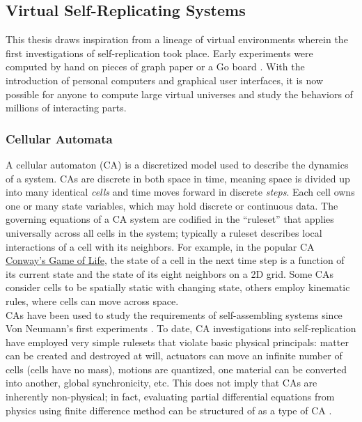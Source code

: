 {\subsection{Virtual Self-Replicating Systems}

This thesis draws inspiration from a lineage of virtual environments wherein the first investigations of self-replication took place.  Early experiments were computed by hand on pieces of graph paper or a Go board \cite{Gardner1970}.  With the introduction of personal computers and graphical user interfaces, it is now possible for anyone to compute large virtual universes and study the behaviors of millions of interacting parts.

\subsubsection{Cellular Automata}

A cellular automaton (CA) is a discretized model used to describe the dynamics of a system.  CAs are discrete in both space in time, meaning space is divided up into many identical \textit{cells} and time moves forward in discrete \textit{steps}.  Each cell owns one or many state variables, which may hold discrete or continuous data.  The governing equations of a CA system are codified in the ``ruleset'' that applies universally across all cells in the system; typically a ruleset describes local interactions of a cell with its neighbors.  For example, in the popular CA \href{https://en.wikipedia.org/wiki/Conway's_Game_of_Life}{Conway's Game of Life}, the state of a cell in the next time step is a function of its current state and the state of its eight neighbors on a 2D grid.  Some CAs consider cells to be spatially static with changing state, others employ kinematic rules, where cells can move across space.\\

CAs have been used to study the requirements of self-assembling systems since Von Neumann's first experiments \cite{Neumann1966}.  To date, CA investigations into self-replication have employed very simple rulesets that violate basic physical principals: matter can be created and destroyed at will, actuators can move an infinite number of cells (cells have no mass), motions are quantized, one material can be converted into another, global synchronicity, etc.  This does not imply that CAs are inherently non-physical; in fact, evaluating partial differential equations from physics using finite difference method can be structured of as a type of CA \cite{Yang2010}.

}
